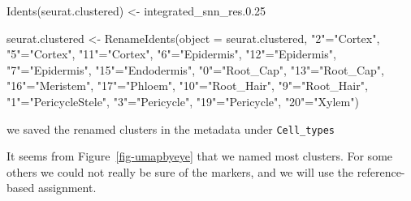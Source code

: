 \documentclass[
  letterpaper,
  DIV=11,
  numbers=noendperiod]{scrartcl}
\newenvironment{Shaded}{}{}
\newcommand{\AttributeTok}[1]{\textcolor[rgb]{0.49,0.56,0.16}{#1}}
\newcommand{\FunctionTok}[1]{\textcolor[rgb]{0.02,0.16,0.49}{#1}}
\newcommand{\NormalTok}[1]{#1}
\newcommand{\OtherTok}[1]{\textcolor[rgb]{0.00,0.44,0.13}{#1}}
\newcommand{\SpecialCharTok}[1]{\textcolor[rgb]{0.25,0.44,0.63}{#1}}
\newcommand{\StringTok}[1]{\textcolor[rgb]{0.25,0.44,0.63}{#1}}
\begin{document}
\begin{Shaded}
\begin{Highlighting}[]
\FunctionTok{Idents}\NormalTok{(seurat.clustered) }\OtherTok{\textless{}{-}} \StringTok{\textquotesingle{}integrated\_snn\_res.0.25\textquotesingle{}}

\NormalTok{seurat.clustered }\OtherTok{\textless{}{-}} \FunctionTok{RenameIdents}\NormalTok{(}\AttributeTok{object =}\NormalTok{ seurat.clustered,}
                               \StringTok{"2"}\OtherTok{=}\StringTok{"Cortex"}\NormalTok{, }\StringTok{"5"}\OtherTok{=}\StringTok{"Cortex"}\NormalTok{, }\StringTok{"11"}\OtherTok{=}\StringTok{"Cortex"}\NormalTok{,}
                               \StringTok{"6"}\OtherTok{=}\StringTok{"Epidermis"}\NormalTok{, }\StringTok{"12"}\OtherTok{=}\StringTok{"Epidermis"}\NormalTok{, }\StringTok{"7"}\OtherTok{=}\StringTok{"Epidermis"}\NormalTok{,}
                               \StringTok{"15"}\OtherTok{=}\StringTok{"Endodermis"}\NormalTok{,  }
                               \StringTok{"0"}\OtherTok{=}\StringTok{"Root\_Cap"}\NormalTok{, }\StringTok{"13"}\OtherTok{=}\StringTok{"Root\_Cap"}\NormalTok{,}
                               \StringTok{"16"}\OtherTok{=}\StringTok{"Meristem"}\NormalTok{,  }
                               \StringTok{"17"}\OtherTok{=}\StringTok{"Phloem"}\NormalTok{,}
                               \StringTok{"10"}\OtherTok{=}\StringTok{"Root\_Hair"}\NormalTok{, }\StringTok{"9"}\OtherTok{=}\StringTok{"Root\_Hair"}\NormalTok{,}
                               \StringTok{"1"}\OtherTok{=}\StringTok{"PericycleStele"}\NormalTok{, }
                               \StringTok{"3"}\OtherTok{=}\StringTok{"Pericycle"}\NormalTok{, }\StringTok{"19"}\OtherTok{=}\StringTok{"Pericycle"}\NormalTok{,}
                               \StringTok{"20"}\OtherTok{=}\StringTok{"Xylem"}\NormalTok{)}
\end{Highlighting}
\end{Shaded}

we saved the renamed clusters in the metadata under \texttt{Cell\_types}

\begin{Shaded}
\end{Shaded}

It seems from Figure~\ref{fig-umapbyeye} that we named most clusters.
For some others we could not really be sure of the markers, and we will
use the reference-based assignment.
\end{document}

